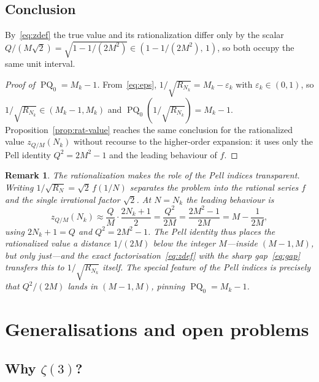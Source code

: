 \documentclass[10pt,a4paper]{amsart}
\newtheorem{remark}[theorem]{Remark}
\DeclareMathOperator{\PQ}{PQ}
\begin{document}
\subsection{Conclusion}

By~\eqref{eq:zdef} the true value and its rationalization differ only by
the scalar $Q/(M\sqrt{2}) = \sqrt{1-1/(2M^2)} \in (1-1/(2M^2),\,1)$, so
both occupy the same unit interval.

\begin{proof}[Proof of $\PQ_0 = M_k - 1$]
  From~\eqref{eq:eps}, $1/\sqrt{R_{N_k}} = M_k - \varepsilon_k$ with
  $\varepsilon_k \in (0,1)$, so $1/\sqrt{R_{N_k}} \in (M_k-1, M_k)$ and
  $\PQ_0(1/\sqrt{R_{N_k}}) = M_k - 1$.  Proposition~\ref{prop:rat-value}
  reaches the same conclusion for the rationalized value $z_{Q/M}(N_k)$
  without recourse to the higher-order expansion: it uses only the Pell
  identity $Q^2 = 2M^2-1$ and the leading behaviour of $f$.
\end{proof}

\begin{remark}
  The rationalization makes the role of the Pell indices transparent.
  Writing $1/\sqrt{R_N} = \sqrt{2}\,f(1/N)$ separates the problem into the
  rational series $f$ and the single irrational factor $\sqrt{2}$.  At
  $N = N_k$ the leading behaviour is
  \[
    z_{Q/M}(N_k) \approx \frac{Q}{M}\cdot\frac{2N_k+1}{2}
    = \frac{Q^2}{2M} = \frac{2M^2-1}{2M} = M - \frac{1}{2M},
  \]
  using $2N_k+1 = Q$ and $Q^2 = 2M^2-1$.  The Pell identity thus places
  the rationalized value a distance $1/(2M)$ below the integer $M$---inside
  $(M-1, M)$, but only just---and the exact factorisation~\eqref{eq:zdef}
  with the sharp gap~\eqref{eq:gap} transfers this to $1/\sqrt{R_{N_k}}$
  itself.  The special feature of the Pell indices is precisely that
  $Q^2/(2M)$ lands in $(M-1, M)$, pinning $\PQ_0 = M_k - 1$.
\end{remark}

\section{Generalisations and open problems}
\label{sec:gen}

\subsection{Why $\zeta(3)$?}
\end{document}
